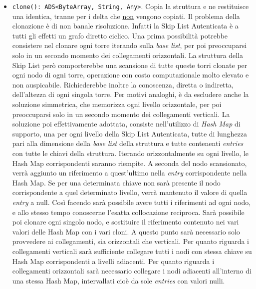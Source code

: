 \begin{itemize}
		\item \verb!clone(): ADS<ByteArray, String, Any>!. Copia la struttura e ne restituisce una identica, tranne per i delta che \underline{non} vengono copiati. Il problema della clonazione è di non banale risoluzione. Infatti la Skip List Autenticata è a tutti gli effetti un grafo diretto ciclico. Una prima possibilità potrebbe consistere nel clonare ogni torre iterando sulla \textit{base list}, per poi preoccuparsi solo in un secondo momento dei collegamenti orizzontali. La struttura della Skip List però comporterebbe una scansione di tutte queste torri clonate per ogni nodo di ogni torre, operazione con costo computazionale molto elevato e non auspicabile. Richiederebbe inoltre la conoscenza, diretta o indiretta, dell'altezza di ogni singola torre. 
		Per motivi analoghi, è da escludere anche la soluzione simmetrica, che memorizza ogni livello orizzontale, per poi preoccuparsi solo in un secondo momento dei collegamenti verticali.
		La soluzione poi effettivamente adottata, consiste nell'utilizzo di \textit{Hash Map} di supporto, una per ogni livello della Skip List Autenticata, tutte di lunghezza pari alla dimensione della \textit{base list} della struttura e tutte contenenti \textit{entries} con tutte le chiavi della struttura. Iterando orizzontalmente su ogni livello, le Hash Map corrispondenti saranno riempite. A seconda del nodo scansionato, verrà aggiunto un riferimento a quest'ultimo nella \textit{entry} corrispondente nella Hash Map. Se per una determinata chiave non sarà presente il nodo corrispondente a quel determinato livello, verrà mantenuto il valore di quella \textit{entry} a null. Così facendo sarà possibile avere tutti i riferimenti ad ogni nodo, e allo stesso tempo conoscerne l'esatta collocazione reciproca. Sarà possibile poi clonare ogni singolo nodo, e sostituire il riferimento contenuto nei vari valori delle Hash Map con i vari cloni. A questo punto sarà necessario solo provvedere ai collegamenti, sia orizzontali che verticali. Per quanto riguarda i collegamenti verticali sarà sufficiente collegare tutti i nodi con stessa chiave su Hash Map corrispondenti a livelli adiacenti. Per quanto riguarda i collegamenti orizzontali sarà necessario collegare i nodi adiacenti all'interno di una stessa Hash Map, intervallati cioè da sole \textit{entries} con valori nulli.	
		
	\end{itemize}


